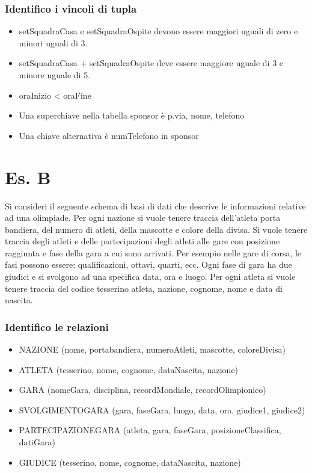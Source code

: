 \subsubsection{Identifico i vincoli di tupla}
\begin{itemize}
    \item setSquadraCasa e setSquadraOspite devono essere maggiori uguali di zero e minori uguali di 3.
    \item setSquadraCasa + setSquadraOspite deve essere maggiore uguale di 3 e minore uguale di 5.
    \item oraInizio < oraFine
    \item Una superchiave nella tabella sponsor è p.via, nome, telefono
    \item Una chiave alternativa è numTelefono in sponsor
\end{itemize}

\section{Es. B}
Si consideri il seguente schema di basi di dati che descrive le informazioni relative ad una olimpiade. Per ogni nazione si vuole tenere traccia dell'atleta porta bandiera, del numero di atleti, della mascotte e colore della divisa. Si vuole tenere traccia degli atleti e delle partecipazioni degli atleti alle gare con posizione raggiunta e fase della gara a cui sono arrivati. Per esempio nelle gare di corsa, le fasi possono essere: qualificazioni, ottavi, quarti, ecc. Ogni fase di gara ha due giudici e si svolgono ad una specifica data, ora e luogo. Per ogni atleta si vuole tenere traccia del codice tesserino atleta, nazione, cognome, nome e data di nascita.

\subsubsection{Identifico le relazioni}
\begin{itemize}
    \item NAZIONE (nome, portabandiera, numeroAtleti, mascotte, coloreDivisa)
    \item ATLETA (tesserino, nome, cognome, dataNascita, nazione)
    \item GARA (nomeGara, disciplina, recordMondiale, recordOlimpionico)
    \item SVOLGIMENTOGARA (gara, faseGara, luogo, data, ora, giudice1, giudice2)
    \item PARTECIPAZIONEGARA (atleta, gara, faseGara, posizioneClassifica, datiGara)
    \item GIUDICE (tesserino, nome, cognome, dataNascita, nazione)
\end{itemize}

